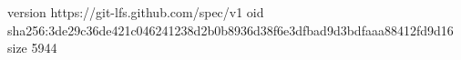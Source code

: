 version https://git-lfs.github.com/spec/v1
oid sha256:3de29c36de421c046241238d2b0b8936d38f6e3dfbad9d3bdfaaa88412fd9d16
size 5944
